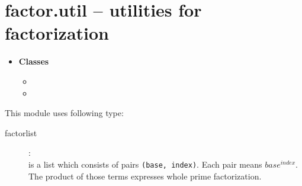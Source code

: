 

 \section{factor.util -- utilities for factorization}
 \begin{itemize}
   \item {\bf Classes}
   \begin{itemize}
     \item {}
     \item {}
   \end{itemize}
 \end{itemize}

 This module uses following type:
 \begin{description}
   \item[factorlist]:\\
      is a list which consists of pairs {\tt (base, index)}.
     Each pair means \(base^{index}\).
     The product of those terms expresses whole prime factorization.
 \end{description}

\C

